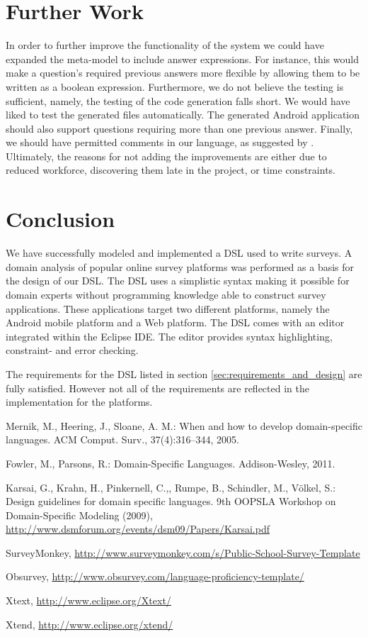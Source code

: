 \documentclass[runningheads]{llncs}
\begin{document}
\section{Further Work}
In order to further improve the functionality of the system we could have expanded the meta-model to include answer expressions. For instance, this would make a question's required previous answers more flexible by allowing them to be written as a boolean expression. Furthermore, we do not believe the testing is sufficient, namely, the testing of the code generation falls short. We would have liked to test the generated files automatically. The generated Android application should also support questions requiring more than one previous answer. Finally, we should have permitted comments in our language, as suggested by \cite{karsai}. Ultimately, the reasons for not adding the improvements are either due to reduced workforce, discovering them late in the project, or time constraints.

\section{Conclusion}
We have successfully modeled and implemented a DSL used to write surveys.
A domain analysis of popular online survey platforms was performed as a basis for the design of our DSL.
The DSL uses a simplistic syntax making it possible for domain experts without programming knowledge able to construct survey applications. 
These applications target two different platforms, namely the Android mobile platform and a Web platform. The DSL comes with an editor integrated within the Eclipse IDE. The editor provides syntax highlighting, constraint- and error checking.

The requirements for the DSL listed in section \ref{sec:requirements_and_design} are fully satisfied. However not all of the requirements are reflected in the implementation for the platforms. 

\begin{thebibliography}{4}

 Mernik, M., Heering, J., Sloane, A. M.: When and how to develop domain-specific languages. ACM Comput. Surv., 37(4):316–344, 2005.

  Fowler, M., Parsons, R.: Domain-Specific Languages. Addison-Wesley, 2011.

 Karsai, G., Krahn, H., Pinkernell, C.,, Rumpe, B., Schindler, M., Völkel, S.: Design guidelines for domain specific languages. 
9th OOPSLA Workshop on Domain-Specific Modeling (2009), \url{http://www.dsmforum.org/events/dsm09/Papers/Karsai.pdf}

SurveyMonkey, \url{http://www.surveymonkey.com/s/Public-School-Survey-Template}

Obsurvey, \url{http://www.obsurvey.com/language-proficiency-template/}

Xtext, \url{http://www.eclipse.org/Xtext/}

Xtend, \url{http://www.eclipse.org/xtend/}

\end{thebibliography}
\end{document}
